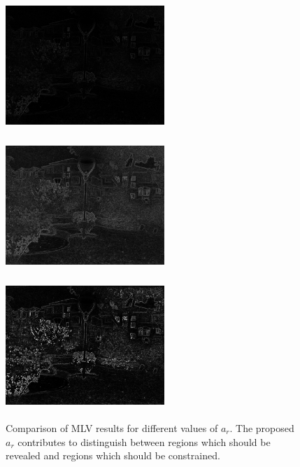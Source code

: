 \begin{figure}[t]
	\centering
	\begin{minipage}[b]{0.49\hsize}
		\centering
		\includegraphics[width=60mm, height=48mm]{images/noise/mlv_10.eps}
		 \label{fig:mlv_normal}
	\end{minipage}
	\begin{minipage}[b]{0.49\hsize}
		\centering
		\includegraphics[width=60mm, height=48mm]{images/noise/mlv_05.eps}
		 \label{fig:mlv_pow}
	\end{minipage}
	\begin{minipage}[b]{0.49\hsize}
		\centering
		\includegraphics[width=60mm, height=48mm]{images/noise/mlv_prop.eps}
		 \label{fig:mlv_prop}
	\end{minipage}
	\caption{Comparison of MLV results for different values of $a_{r}$. The proposed $a_{r}$ contributes to distinguish between regions which should be revealed and regions which should be constrained.}
	\label{fig:mlv_change}
\end{figure}
